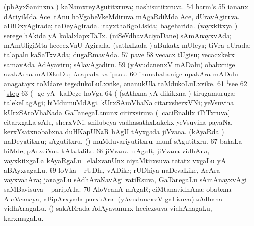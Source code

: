  (phAyxSaninxna \vi) kaNamxreyAgutitxruva; nashisutitxruva. 
\eanum
\numie
\num{54}  \hyperref{kandict_h.pdf}{H}{harm(1) nuga}{harm's}  
\num{55}  tananx dAriyiMda Ace; tAnu hoVgabeVkeMdiruva mAgaRdiMda Ace, dUravAgiruva. 
  
\banum
{} aDiDxyAgirada; taDeyAgirada. 
 itayxthaRgoLisida; bageharida. 
 (vayxkitxya \vi) serege hAkida yA kolalxlapxTaTx. 
 (niSeVdhavAciyoDane) sAmAnayxvAda; mAmUligiMta hececxVnU Agirada. 
 (sathxLada \vi) aBukatx mUleya; tiVra dUrada; talapalu kaSaTxvAda; dugaRmavAda. 
\eanum
\numie
\num{57} \hyperref{kandict_p.pdf}{P}{pave pagu}{pave}  
\num{58}  vecacx tUgisu; vecacxkekx samavAda AdAyaviru; sAlavAgadiru. 
\num{59}  (yAvudanenxV mADalu) obabxnige avakAsha mADikoDu; Asapxda kalipxsu. 
\num{60}  inonxbabxnige upakAra mADalu anagatayx toMdare tegedukoLuLxvike, ananukUla taMdukoLuLxvike. 
\num{61} \hyperref{kandict_s.pdf}{S}{see(1) pagu(23)}{$^1$see}  
\num{62} \hyperref{kandict_s.pdf}{S}{step(1) pagu(10)}{$^1$step}  
\num{63}  (  -ge yA -kaDege hoVgu 
\num{64}  (  (sAthxna yA dikikxna \vi) tirugamuruga; talekeLagAgi; hiMdumuMdAgi. 
  
\banum
{} kUrxSAroVhaNa citarxsherxVNi; yeVsuvina kUrxSAroVhaNada GaTanegaLanunx citirxsiruva (\kanmu\ caciRnalilx iTiTxruva) citarxgaLa sAlu, sherxVNi. 
 shilubeya vadhasathxLakekx yeVsuvina payaNa. 
 kerxYsatxnobabxna duHKapUNaR hAgU tAyxgada jiVvana. 
\eanum
\numie
{}  
\banum
{} (kAyaRda \vi) naDeyutitxru; sAgutitxru. 
 (\rUpa) muMduvariyutitxru, munf sAgutitxru. 
\eanum
\numie
\num{67}  bahaLa hiMde; pArxciVna kAladalilx. 
\num{68}  jiVvana mAgaR; jiVvana vidhAna; vayxkitxgaLa kAyaRgaLu \mo\ elalxvanUnx niyaMtirxsuva tatatx vxgaLu yA aBAyxsagaLu. 
\num{69}  loVka -- rUDhi, vADike; rUDhiya naDevaLike, AcAra vayxvahAra; janagaLu sAdhAraNavAgi vatiRsuva, GaTanegaLu sAmAnayxvAgi saMBavisuva -- paripATa. 
\num{70}  AloVcanA mAgaR; ciMtanavidhAna:  obabxna AloVcaneya, aBipArxyada parxkAra. 
  
\banum
{} (yAvudanenxV gaLisuva) sAdhana vidhAnagaLu. 
 (\birx) sakARrada AdAyavanunx hecicxsuva vidhAnagaLu, karxmagaLu. 
\eanum
\numie
\enum
\emng
\eentry

